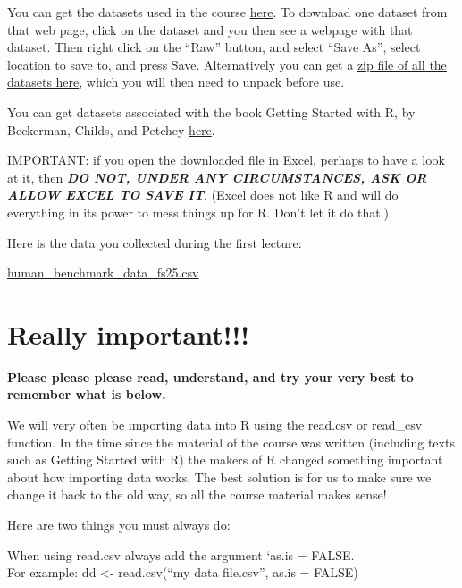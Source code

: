 \documentclass[
  letterpaper,
  8pt,
  a4paper]{book}
\begin{document}

You can get the datasets used in the course
\href{https://github.com/opetchey/BIO144/tree/master/3_datasets}{here}.
To download one dataset from that web page, click on the dataset and you
then see a webpage with that dataset. Then right click on the ``Raw''
button, and select ``Save As'', select location to save to, and press
Save. Alternatively you can get a
\href{https://github.com/opetchey/BIO144/raw/master/3_datasets/all_datasets_bio144.zip}{zip
file of all the datasets here}, which you will then need to unpack
before use.

You can get datasets associated with the book Getting Started with R, by
Beckerman, Childs, and Petchey
\href{http://r4all.org/books/datasets/}{here}.

IMPORTANT: if you open the downloaded file in Excel, perhaps to have a
look at it, then \textbf{\emph{DO NOT, UNDER ANY CIRCUMSTANCES, ASK OR
ALLOW EXCEL TO SAVE IT}}. (Excel does not like R and will do everything
in its power to mess things up for R. Don't let it do that.)

Here is the data you collected during the first lecture:

\href{https://lms.uzh.ch/url/RepositoryEntry/17654940136/CourseFolder/0/path\%3D~~human\%5Fbenchmark\%5Fdata\%5FFS25\%2Ecsv/0}{human\_benchmark\_data\_fs25.csv}

\section*{Really important!!!}\label{really-important}


\textbf{Please please please read, understand, and try your very best to
remember what is below.}

We will very often be importing data into R using the read.csv or
read\_csv function. In the time since the material of the course was
written (including texts such as Getting Started with R) the makers of R
changed something important about how importing data works. The best
solution is for us to make sure we change it back to the old way, so all
the course material makes sense!

Here are two things you must always do:

When using read.csv always add the argument `as.is = FALSE.\\
For example: dd \textless- read.csv(``my data file.csv'', as.is = FALSE)
\end{document}
